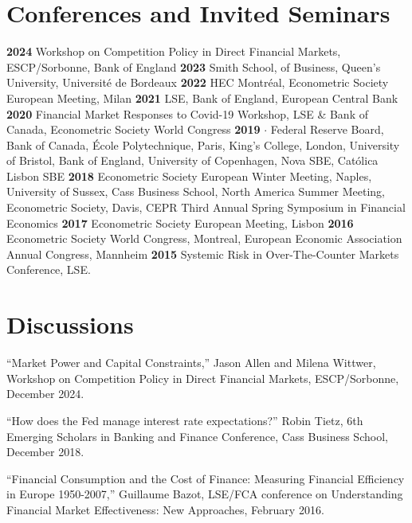 \documentclass[margin,line, 11pt]{res}
\newenvironment{list1}{
  \begin{list}{\ding{113}}{%
      \setlength{\itemsep}{0in}
      \setlength{\parsep}{0in} \setlength{\parskip}{0in}
      \setlength{\topsep}{0in} \setlength{\partopsep}{0in} 
      \setlength{\leftmargin}{0.17in}}}{\end{list}}
\begin{document}
\begin{resume}
\section{\sc Conferences and Invited Seminars} 
\begin{list1}
\item[]  \textbf{2024} Workshop on Competition Policy in Direct Financial Markets, ESCP/Sorbonne, Bank of England \textbf{2023} Smith School, of Business, Queen's University, Universit\'e de Bordeaux \textbf{2022} HEC Montr\'eal, Econometric Society European Meeting, Milan \textbf{2021} LSE, Bank of England, European Central Bank \textbf{2020} Financial Market Responses to Covid-19 Workshop, LSE \& Bank of Canada, Econometric Society World Congress \textbf{2019} $\cdot$ Federal Reserve Board, Bank of Canada, \'Ecole Polytechnique, Paris, King's College, London, University of Bristol, Bank of England, University of Copenhagen, Nova SBE, Cat\'olica Lisbon SBE \textbf{2018} Econometric Society European Winter Meeting, Naples, University of Sussex, Cass Business School, North America Summer Meeting, Econometric Society, Davis, CEPR Third Annual Spring Symposium in Financial Economics  \textbf{2017}  Econometric Society European Meeting, Lisbon  \textbf{2016}  Econometric Society World Congress, Montreal, European Economic Association Annual Congress, Mannheim \textbf{2015} Systemic Risk in Over-The-Counter Markets Conference, LSE.
\end{list1}

\section{\sc Discussions} 
\begin{list1}
\item[] ``Market Power and Capital Constraints,'' Jason Allen and Milena Wittwer, Workshop on Competition Policy in Direct Financial Markets, ESCP/Sorbonne, December 2024.
\item[] ``How does the Fed manage interest rate expectations?'' Robin Tietz, 6th Emerging Scholars in Banking and Finance Conference, Cass Business School, December 2018.
\item[] ``Financial Consumption and the Cost of Finance: Measuring Financial Efficiency in Europe 1950-2007,'' Guillaume Bazot, LSE/FCA conference on Understanding Financial Market Effectiveness: New Approaches, February 2016. 
\end{list1}


\end{resume}
\end{document}
